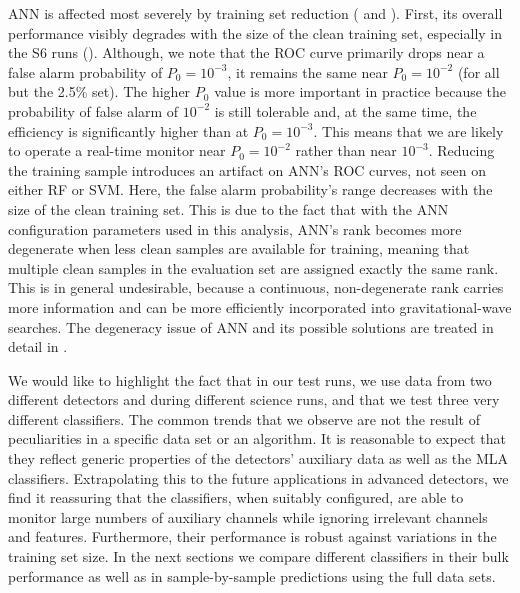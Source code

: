 \documentclass[prd, twocolumn, lengthcheck, superscriptaddress, showpacs, letterpaper, nofootinbib]{revtex4-1}
\begin{document}
\ac{ANN} is affected most severely by training set reduction ( and ). First, its overall performance visibly degrades with the size of the clean training set, especially in the S6 runs (). Although, we note that the \ac{ROC} curve primarily drops near a false alarm probability of $P_{0}=10^{-3}$, it remains the same near $P_{0}=10^{-2}$ (for all but the 2.5\% set). The higher $P_0$ value is more important in practice because the  probability of false alarm of  $10^{-2}$ is still tolerable and, at the same time, the efficiency is significantly higher than at $P_{0}=10^{-3}$. This means that we are likely to operate a real-time monitor near $P_0=10^{-2}$ rather than near $10^{-3}$. Reducing the training sample introduces an artifact on \ac{ANN}'s \ac{ROC} curves, not seen on either \ac{RF} or \ac{SVM}. Here, the false alarm probability's range decreases with the size of the clean training set. This is due to the fact that with the \ac{ANN} configuration parameters used in this analysis, \ac{ANN}'s rank becomes more degenerate when less clean samples are available for training, meaning that multiple clean samples in the evaluation set are assigned exactly the same rank. This is in general undesirable, because a continuous, non-degenerate rank carries more information and can be more efficiently incorporated into gravitational-wave searches. The degeneracy issue of ANN and its possible solutions are treated in detail in \cite{Kim:2012}.   
      

We would like to highlight the fact that in our test runs, we use data from two different detectors and during different science runs, and that we test three very different classifiers.  The common  trends that we observe are not the result of peculiarities in a specific data set or an algorithm. It is reasonable to expect that they reflect generic properties of the detectors' auxiliary data as well as the \ac{MLA} classifiers. Extrapolating this to the future applications in advanced detectors, we find it reassuring that the classifiers, when suitably configured, are able to monitor large numbers of auxiliary channels while ignoring irrelevant channels and features. Furthermore, their performance is robust against variations in the training set size. In the next sections we compare different classifiers in their bulk performance as well as in sample-by-sample predictions using the full data sets.         
\end{document}
